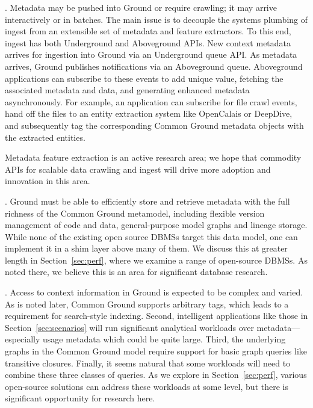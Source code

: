 \documentclass{sig-alternate}
\begin{document}
.  Metadata may be pushed into Ground or require crawling; it may arrive interactively or in batches. 
The main issue is to decouple the systems plumbing of ingest from an extensible set of metadata and feature extractors.
To this end, ingest has both Underground and Aboveground APIs.
New context metadata arrives for ingestion into Ground via an Underground queue API. 
As metadata arrives, Ground publishes notifications via an Aboveground queue. Aboveground applications can subscribe to these events to add unique value, fetching the associated metadata and data, and generating enhanced metadata asynchronously. 
For example, an application can subscribe for file crawl events, hand off the files to an entity extraction system like OpenCalais or DeepDive, and subsequently tag the corresponding Common Ground metadata objects with  the extracted entities.

Metadata feature extraction is an active research area; we hope that commodity APIs for scalable data crawling and ingest will drive more adoption and innovation in this area. 

.  Ground must be able to efficiently store and retrieve metadata with the full richness of the Common Ground metamodel, including flexible version management of code and data, general-purpose model graphs and lineage storage. 
While none of the existing open source DBMSs target this data model, one can implement it in a shim layer above many of them. 
We discuss this at greater length in Section~\ref{sec:perf}, where we examine a range of open-source DBMSs. As noted there, we believe this is an area for significant database research.

.  Access to context information in Ground is expected to be complex and varied. As is noted later, Common Ground supports arbitrary tags, which leads to a requirement for search-style indexing.
Second, intelligent applications like those in Section~\ref{sec:scenarios} will run significant analytical workloads over metadata---especially usage metadata which could be quite large.  
Third, the underlying graphs in the Common Ground model require support for basic graph queries like transitive closures. 
Finally, it seems natural that some workloads will need to combine these three classes of queries.
As we explore in Section~\ref{sec:perf}, various open-source solutions can address these workloads at some level, but there is significant opportunity for research here.
\end{document}
